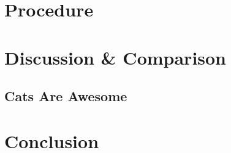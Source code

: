 \documentclass[12pt,a4paper]{article}
\begin{document}
	\section{Procedure}
	
	\clearpage
			
	\section{Discussion \& Comparison}									
									
		\subsection{Cats Are Awesome}
																					
	\clearpage

	\section{Conclusion}
	
	\clearpage
	
	\printbibliography
	\nocite{*}
	
	\clearpage

	\glsaddall
	\printglossaries
	
	\clearpage
	
\end{document}
